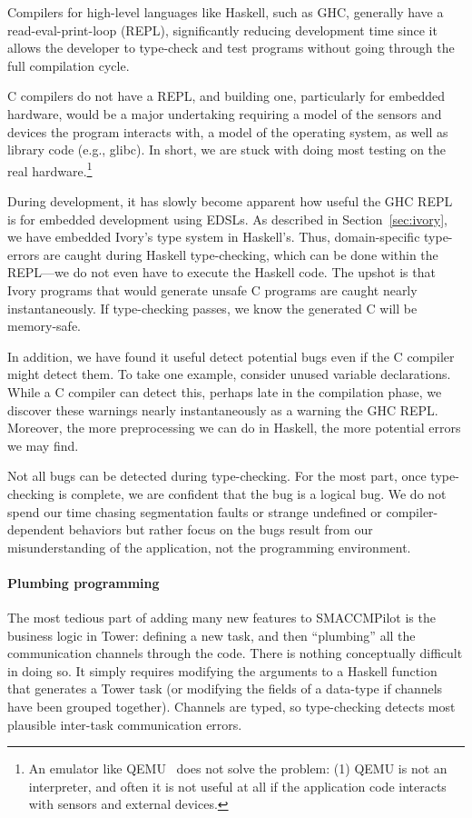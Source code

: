 Compilers for high-level languages like Haskell, such as GHC, generally have a
read-eval-print-loop (REPL), significantly reducing development time since it
allows the developer to type-check and test programs without going through the
full compilation cycle.

C compilers do not have a REPL, and building one, particularly for embedded
hardware, would be a major undertaking requiring a model of the sensors and
devices the program interacts with, a model of the operating system, as well as
library code (e.g., glibc).  In short, we are stuck with doing most testing on
the real hardware.\footnote{An emulator like QEMU~\cite{} does not solve the
  problem: (1) QEMU is not an interpreter, and often it is not useful at all if
  the application code interacts with sensors and external devices.}

During development, it has slowly become apparent how useful the GHC REPL is for
embedded development using EDSLs.  As described in Section~\ref{sec:ivory}, we
have embedded Ivory's type system in Haskell's.  Thus, domain-specific
type-errors are caught during Haskell type-checking, which can be done within
the REPL---we do not even have to execute the Haskell code.  The upshot is that
Ivory programs that would generate unsafe C programs are caught nearly
instantaneously.  If type-checking passes, we know the generated C will be
memory-safe.

In addition, we have found it useful detect potential bugs even if the C
compiler might detect them.  To take one example, consider unused variable
declarations.  While a C compiler can detect this, perhaps late in the
compilation phase, we discover these warnings nearly instantaneously as a
warning the GHC REPL.  Moreover, the more preprocessing we can do in Haskell,
the more potential errors we may find.

Not all bugs can be detected during type-checking.  For the most part, once
type-checking is complete, we are confident that the bug is a logical bug.  We
do not spend our time chasing segmentation faults or strange undefined or
compiler-dependent behaviors but rather focus on the bugs result from our
misunderstanding of the application, not the programming environment.

\paragraph{Plumbing programming}
The most tedious part of adding many new features to SMACCMPilot is the business
logic in Tower: defining a new task, and then ``plumbing'' all the communication
channels through the code.  There is nothing conceptually difficult in doing so.
It simply requires modifying the arguments to a Haskell function that generates
a Tower task (or modifying the fields of a data-type if channels have been
grouped together).  Channels are typed, so type-checking detects most plausible
inter-task communication errors.

